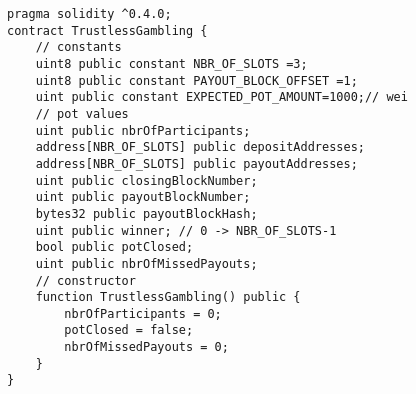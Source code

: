 \begin{lstlisting}
pragma solidity ^0.4.0;
contract TrustlessGambling {
    // constants
    uint8 public constant NBR_OF_SLOTS =3;
    uint8 public constant PAYOUT_BLOCK_OFFSET =1;
    uint public constant EXPECTED_POT_AMOUNT=1000;// wei
    // pot values
    uint public nbrOfParticipants;
    address[NBR_OF_SLOTS] public depositAddresses;
    address[NBR_OF_SLOTS] public payoutAddresses;
    uint public closingBlockNumber;
    uint public payoutBlockNumber;
    bytes32 public payoutBlockHash;
    uint public winner; // 0 -> NBR_OF_SLOTS-1
    bool public potClosed;
    uint public nbrOfMissedPayouts;
    // constructor
    function TrustlessGambling() public {
        nbrOfParticipants = 0;
        potClosed = false;
        nbrOfMissedPayouts = 0;
    }
}
\end{lstlisting}

